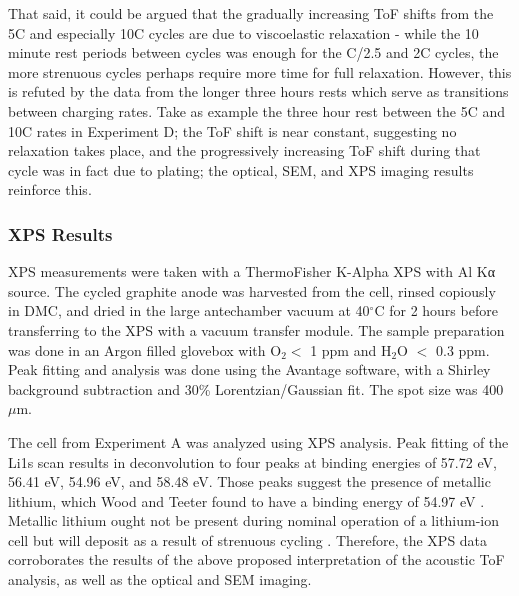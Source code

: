 That said, it could be argued that the gradually increasing ToF shifts from the 5C and especially 10C cycles are due to viscoelastic relaxation - while the 10 minute rest periods between cycles was enough for the C/2.5 and 2C cycles, the more strenuous cycles perhaps require more time for full relaxation. However, this is refuted by the data from the longer three hours rests which serve as transitions between charging rates. Take as example the three hour rest between the 5C and 10C rates in Experiment D; the ToF shift is near constant, suggesting no relaxation takes place, and the progressively increasing ToF shift during that cycle was in fact due to plating; the optical, SEM, and XPS imaging results reinforce this.

\subsubsection{XPS Results}
XPS measurements were taken with a ThermoFisher K-Alpha XPS with Al Kα source. The cycled graphite anode was harvested from the cell, rinsed copiously in DMC, and dried in the large antechamber vacuum at 40$^{\circ}$C for 2 hours before transferring to the XPS with a vacuum transfer module. The sample preparation was done in an Argon filled glovebox with O$_2 <$ 1 ppm and H$_2$O $<$ 0.3 ppm. Peak fitting and analysis was done using the Avantage software, with a Shirley background subtraction and 30\% Lorentzian/Gaussian fit. The spot size was 400 $\mu$m.

The cell from Experiment A was analyzed using XPS analysis. Peak fitting of the Li1s scan results in deconvolution to four peaks at binding energies of 57.72 eV, 56.41 eV, 54.96 eV, and 58.48 eV. Those peaks suggest the presence of metallic lithium, which Wood and Teeter found to have a binding energy of 54.97 eV \cite{BE}. Metallic lithium ought not be present during nominal operation of a lithium-ion cell but will deposit as a result of strenuous cycling \cite{lithium}. Therefore, the XPS data corroborates the results of the above proposed interpretation of the acoustic ToF analysis, as well as the optical and SEM imaging.

